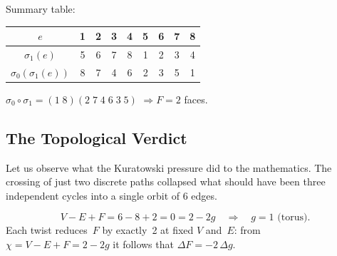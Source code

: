 \medskip
\noindent
Summary table:
\begin{center}
\renewcommand{\arraystretch}{1.15}
\begin{tabular}{c@{\;\;}c@{\;\;}c@{\;\;}c@{\;\;}c@{\;\;}c@{\;\;}c@{\;\;}c@{\;\;}c}
\toprule
$e$ & 1 & 2 & 3 & 4 & 5 & 6 & 7 & 8 \\
\midrule
$\sigma_1(e)$ & 5 & 6 & 7 & 8 & 1 & 2 & 3 & 4 \\
$\sigma_0(\sigma_1(e))$ & 8 & 7 & 4 & 6 & 2 & 3 & 5 & 1 \\
\bottomrule
\end{tabular}
\end{center}
$\sigma_0 \circ \sigma_1 = (1\;8)(2\;7\;4\;6\;3\;5)$
\quad$\Longrightarrow$\quad $F = 2$ faces.

\subsection{The Topological Verdict}

Let us observe what the Kuratowski pressure did to the mathematics.
The crossing of just two discrete paths collapsed what should have
been three independent cycles into a single orbit of 6 edges.

\[
  V - E + F = 6 - 8 + 2 = 0 = 2 - 2g
  \quad\Longrightarrow\quad \boxed{g = 1} \text{ (torus).}
\]
Each twist reduces~$F$ by exactly~2 at fixed $V$ and~$E$: from
$\chi = V - E + F = 2 - 2g$ it follows that $\Delta F = -2\,\Delta g$.


